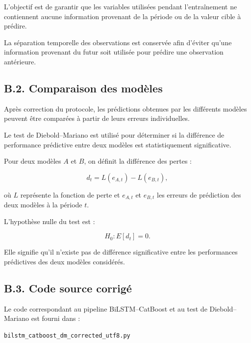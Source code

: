 L'objectif est de garantir que les variables utilisées pendant l'entraînement
ne contiennent aucune information provenant de la période ou de la valeur
cible à prédire.

La séparation temporelle des observations est conservée afin d'éviter qu'une
information provenant du futur soit utilisée pour prédire une observation
antérieure.

\subsection*{B.2. Comparaison des modèles}

Après correction du protocole, les prédictions obtenues par les différents
modèles peuvent être comparées à partir de leurs erreurs individuelles.

Le test de Diebold--Mariano est utilisé pour déterminer si la différence de
performance prédictive entre deux modèles est statistiquement significative.

Pour deux modèles $A$ et $B$, on définit la différence des pertes :

\begin{equation}
d_t = L(e_{A,t}) - L(e_{B,t}),
\end{equation}

où $L$ représente la fonction de perte et $e_{A,t}$ et $e_{B,t}$ les erreurs
de prédiction des deux modèles à la période $t$.

L'hypothèse nulle du test est :

\begin{equation}
H_0 : E[d_t] = 0.
\end{equation}

Elle signifie qu'il n'existe pas de différence significative entre les
performances prédictives des deux modèles considérés.

\subsection*{B.3. Code source corrigé}

Le code correspondant au pipeline BiLSTM--CatBoost et au test de
Diebold--Mariano est fourni dans :

\begin{center}
\texttt{bilstm\_catboost\_dm\_corrected\_utf8.py}
\end{center}




